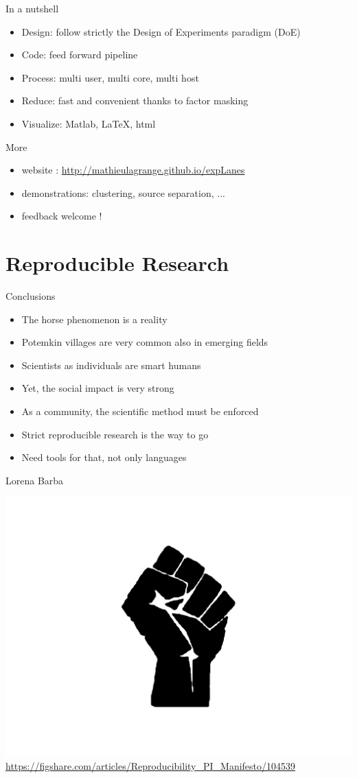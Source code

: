 \documentclass[compress]{beamer}
\begin{document}
\begin{frame}{In a nutshell}
\begin{itemize}
\item Design: follow strictly the Design of Experiments paradigm (DoE)
\item Code: feed forward pipeline
\item Process: multi user, multi core, multi host
\item Reduce: fast and convenient thanks to factor masking
\item Visualize: Matlab, \LaTeX, html
\end{itemize}
\end{frame}

\begin{frame}{More}
\begin{itemize}
\item website : \url{http://mathieulagrange.github.io/expLanes}
\item demonstrations: clustering, source separation, ...
\item feedback welcome !
\end{itemize}
\end{frame}

\section{Reproducible Research}

\begin{frame}{Conclusions}
\begin{itemize}
\item The horse phenomenon is a reality
\item Potemkin villages are very common also in emerging fields
\item Scientists as individuals are smart humans
\item Yet, the social impact is very strong
\item As a community, the scientific method must be enforced
\item Strict reproducible research is the way to go
\item Need tools for that, not only languages
\end{itemize}
\end{frame}

\begin{frame}{Lorena Barba}
\begin{center}
\includegraphics[width=.7\columnwidth]{figures/manifesto} \\
\url{https://figshare.com/articles/Reproducibility_PI_Manifesto/104539}
\end{center}
\end{frame}
\end{document}

